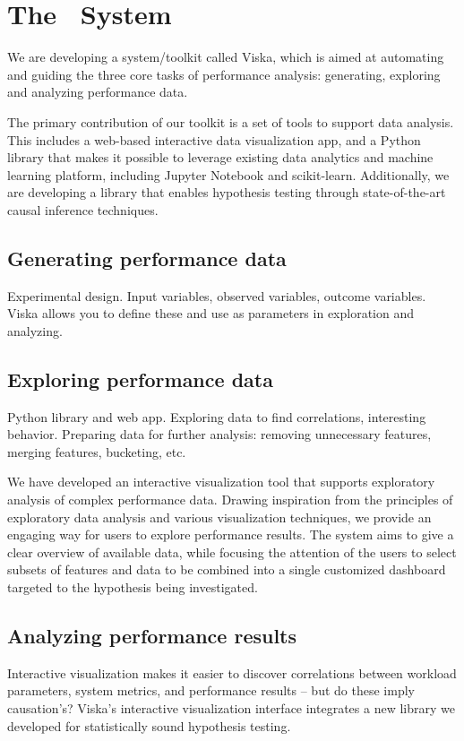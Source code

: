 
\section{The \GSQL \ System}

We are developing a system/toolkit called Viska, which is aimed at automating
and guiding the three core tasks of performance analysis: generating,
exploring and analyzing performance data.

The primary contribution of our toolkit is a set of tools to support
data analysis.
This includes a web-based interactive data visualization app, and a
Python library that makes it possible to leverage existing data
analytics and machine learning platform, including Jupyter Notebook
and scikit-learn.
Additionally, we are developing a
library that enables hypothesis testing through state-of-the-art causal inference
techniques. %

\subsection{Generating performance data}
Experimental design. Input variables, observed variables, outcome variables.
Viska allows you to define these and use as parameters in exploration and
analyzing.

\subsection{Exploring performance data}
Python library and web app. Exploring data to find correlations, interesting
behavior. Preparing data for further analysis: removing unnecessary features,
merging features, bucketing, etc.

We have developed an interactive visualization
tool that supports exploratory analysis of complex performance
data. Drawing inspiration from the principles of exploratory
data analysis and various visualization techniques,
we provide an engaging way for users to explore performance
results. The system aims to give a clear overview
of available data, while focusing the attention of the users to
select subsets of features and data to be combined into a single
customized dashboard targeted to the hypothesis being
investigated.

\subsection{Analyzing performance results}
Interactive visualization makes it easier to discover correlations
between workload parameters, system metrics, and performance results
-- but do these imply causation's? Viska's
interactive visualization interface integrates a new library we
developed for statistically sound hypothesis testing.

